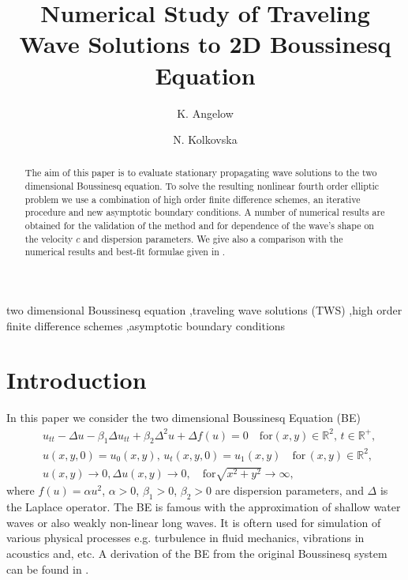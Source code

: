\documentclass[preprint]{elsarticle}
\newcommand{\RR}{\mathbb{R}}
\begin{document}
\begin{frontmatter}

\title{Numerical Study of Traveling Wave Solutions to 2D Boussinesq  Equation}


\author{K. Angelow}
\author{N. Kolkovska}

\address{Institute of Mathematics and Informatics, Bulgarian Academy of Sciences, Acad. G.~Bonchev Bl.8, 1113 Sofia, Bulgaria}

\begin{abstract}
The aim of this paper is to evaluate stationary  propagating  wave solutions  
 to the two dimensional Boussinesq  equation. To solve the resulting nonlinear fourth order elliptic  problem we use a  combination of high order finite difference schemes, an iterative procedure  and  new asymptotic boundary conditions.   A number of numerical results are obtained for the validation of the method and for dependence of the wave's shape on the velocity $c$ and dispersion parameters. We give also a comparison with  the numerical results and best-fit formulae given in \cite{Ch2011,Ch2012}.

\end{abstract}
\begin{keyword}
two dimensional Boussinesq  equation \sep traveling wave solutions (TWS) \sep high order finite difference schemes \sep asymptotic boundary conditions
 \end{keyword}
\end{frontmatter}


\section{Introduction}\label{introduction}

In this paper we  consider the two dimensional Boussinesq  Equation (BE)
\begin{align}
&u_{tt} - \Delta u -\beta_1  \Delta u_{tt} +\beta_2 \Delta ^2 u + \Delta f(u)=0   \quad \text{for}  (x,y) \in \RR^2, \, t\in\RR^+,\label{eq1}
\\ \nonumber &u(x,y,0)=u_0(x,y), \, u_t(x,y,0)=u_1(x,y)   \quad\text{for} \, (x,y) \in \RR^2,
\\  &u(x,y) \rightarrow 0,  \Delta u(x,y) \rightarrow 0 ,  \quad \text{for}  \sqrt{x^2 + y^2} \rightarrow \infty, \label{eq11}
\end{align}
where   $f(u)=\alpha u^2$,  $\alpha>0$, $\beta_1>0$, $\beta_2>0$  are dispersion parameters, and $\Delta$ is the Laplace operator. The BE is famous with the approximation of shallow water waves or also weakly non-linear long waves. It is oftern used for simulation of various physical processes e.g. turbulence in fluid mechanics, vibrations in acoustics and, etc. A derivation of the BE from the original Boussinesq system can be found in \cite{ChChr}.
\end{document}
